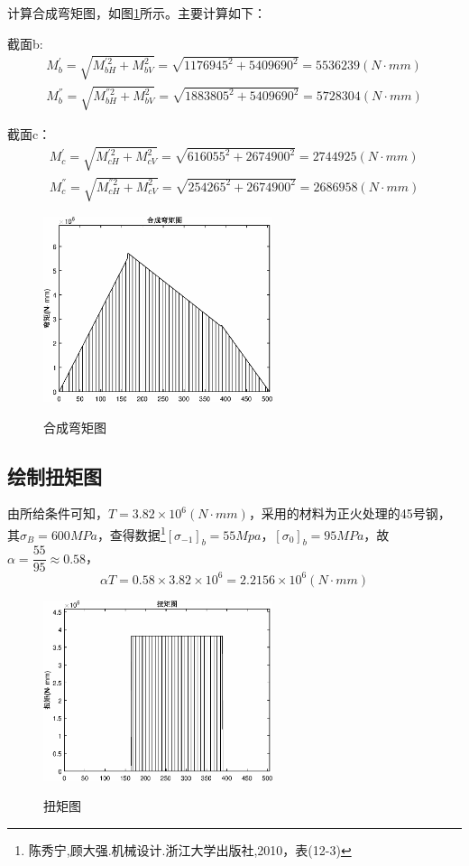 	计算合成弯矩图，如图\ref{wan-he}所示。主要计算如下：
	
		截面b:
			\begin{align}
				M^{′}_{b}=\sqrt{M^{′2}_{bH}+M^{2}_{bV}}=\sqrt{1176945^2 + 5409690^2}=5536239(N\cdot mm)\\
				M^{″}_{b}=\sqrt{M^{″2}_{bH}+M^{2}_{bV}}=\sqrt{1883805^2 + 5409690^2}=5728304(N\cdot mm)
			\end{align}
			
		截面c：
			\begin{align}
				M^{′}_{c}=\sqrt{M^{′2}_{cH}+M^{2}_{cV}}=\sqrt{616055^2 + 2674900^2}=2744925(N\cdot mm)\\
				M^{″}_{c}=\sqrt{M^{″2}_{cH}+M^{2}_{cV}}=\sqrt{254265^2 + 2674900^2}=2686958(N\cdot mm)
			\end{align}

	\begin{figure}[H]
		\centering
		\includegraphics[width=0.6\textwidth]{./pic/wan_he.eps}\\
		\caption{合成弯矩图}\label{wan-he}
	\end{figure}

	\subsection{绘制扭矩图}
	由所给条件可知，$T=3.82\times 10^6 (N\cdot mm)$，采用的材料为正火处理的45号钢，其$\sigma_B =600 MPa$，查得数据\footnote{陈秀宁,顾大强.机械设计.浙江大学出版社,2010，表(12-3)}$[\sigma_{-1}]_b = 55 Mpa$，$[\sigma_{0}]_b =95MPa$，故$\alpha = \dfrac{55}{95} \approx 0.58$，
	\[\alpha T=0.58\times 3.82\times 10^6 =2.2156\times 10^6 (N\cdot mm)\]

	\begin{figure}[H]
		\centering
		\includegraphics[width=0.6\textwidth]{./pic/niu.eps}\\
		\caption{扭矩图}\label{niu}
	\end{figure}

